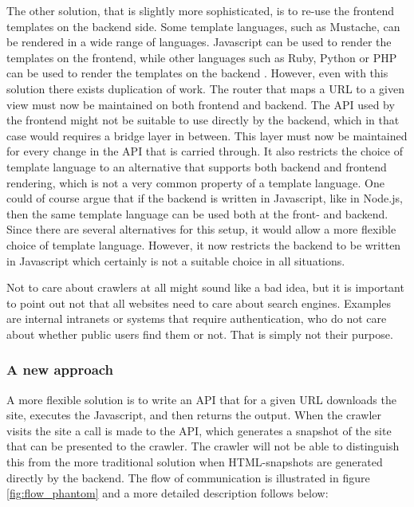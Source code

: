 The other solution, that is slightly more sophisticated, is to re-use the frontend templates on the backend side. Some template languages, such as Mustache, can be rendered in a wide range of languages. Javascript can be used to render the templates on the frontend, while other languages such as Ruby, Python or PHP can be used to render the templates on the backend \cite{mustache}. However, even with this solution there exists duplication of work. The router that maps a URL to a given view must now be maintained on both frontend and backend. The API used by the frontend might not be suitable to use directly by the backend, which in that case would requires a bridge layer in between. This layer must now be maintained for every change in the API that is carried through. It also restricts the choice of template language to an alternative that supports both backend and frontend rendering, which is not a very common property of a template language. One could of course argue that if the backend is written in Javascript, like in Node.js, then the same template language can be used both at the front- and backend. Since there are several alternatives for this setup, it would allow a more flexible choice of template language. However, it now restricts the backend to be written in Javascript which certainly is not a suitable choice in all situations.

Not to care about crawlers at all might sound like a bad idea, but it is important to point out not that all websites need to care about search engines. Examples are internal intranets or systems that require authentication, who do not care about whether public users find them or not. That is simply not their purpose.

\subsubsection{A new approach}
\label{sec:seo_a_new_approach}

A more flexible solution is to write an API that for a given URL downloads the site, executes the Javascript, and then returns the output. When the crawler visits the site a call is made to the API, which generates a snapshot of the site that can be presented to the crawler. The crawler will not be able to distinguish this from the more traditional solution when HTML-snapshots are generated directly by the backend. The flow of communication is illustrated in figure \ref{fig:flow_phantom} and a more detailed description follows below:

